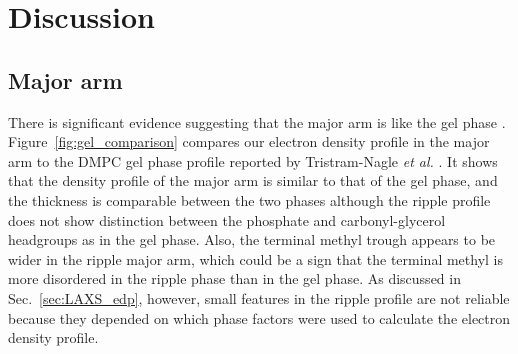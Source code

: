 \newpage
\section{Discussion}\label{sec:ripple_discussion}
\subsection{Major arm}
There is significant evidence suggesting that the major arm is like 
the gel phase \cite{ref:Tardieu73,ref:Schneider83,ref:Sun96,ref:Riske09}. 
Figure~\ref{fig:gel_comparison} compares our electron density
profile in the major arm to the DMPC gel phase profile reported by 
Tristram-Nagle \textit{et al.} \cite{Tristram-Nagle02}. 
It shows that the density profile of the major arm is similar to that 
of the gel phase, and the thickness is comparable between the two phases
although the ripple profile does not show distinction
between the phosphate and carbonyl-glycerol headgroups as in the gel phase.
Also, the terminal methyl trough appears to be wider in the ripple major arm,
which could be a sign that the terminal methyl is more disordered
in the ripple phase than in the gel phase.
As discussed in
Sec.~\ref{sec:LAXS_edp}, however, small features in the ripple profile are not
reliable because they depended on which phase factors were used
to calculate the electron density profile.

